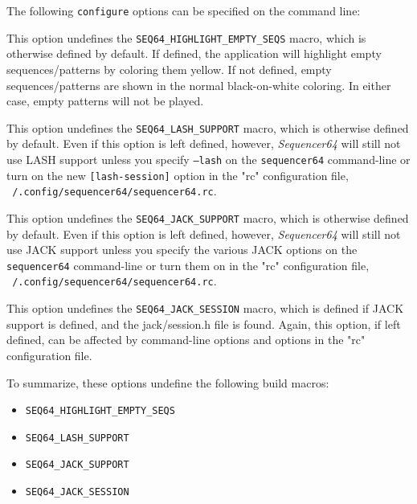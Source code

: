    The following \texttt{configure} options can be specified on the command
   line:

   \setcounter{ItemCounter}{0}      %

        This option undefines the \texttt{SEQ64\_HIGHLIGHT\_EMPTY\_SEQS}
        macro, which is otherwise defined by default.  If defined, the
        application will
        highlight empty sequences/patterns by coloring them yellow.
        If not defined, empty sequences/patterns are shown in the normal
        black-on-white coloring.  In either case, empty patterns will not be
        played.

        This option undefines the \texttt{SEQ64\_LASH\_SUPPORT} macro, which is
        otherwise defined by default.  Even if this option is left defined,
        however, \textsl{Sequencer64} will still not use LASH support unless
        you specify \texttt{--lash} on the \texttt{sequencer64} command-line or
        turn on the new \texttt{[lash-session]} option in the "rc"
        configuration file,
        \texttt{~/.config/sequencer64/sequencer64.rc}.

        This option undefines the \texttt{SEQ64\_JACK\_SUPPORT} macro, which is
        otherwise defined by default.  Even if this option is left defined,
        however, \textsl{Sequencer64} will still not use JACK support unless
        you specify the various JACK options on the \texttt{sequencer64}
        command-line or turn them on in the "rc" configuration file,
        \texttt{~/.config/sequencer64/sequencer64.rc}.

        This option undefines the \texttt{SEQ64\_JACK\_SESSION} macro, which is
        defined if JACK support is defined, and the jack/session.h file is
        found.  Again, this option, if left defined, can be affected by
        command-line options and options in the "rc" configuration file.

    To summarize, these options undefine the following build macros:

      \begin{itemize}
        \item \texttt{SEQ64\_HIGHLIGHT\_EMPTY\_SEQS}
        \item \texttt{SEQ64\_LASH\_SUPPORT}
        \item \texttt{SEQ64\_JACK\_SUPPORT}
        \item \texttt{SEQ64\_JACK\_SESSION}
      \end{itemize}

